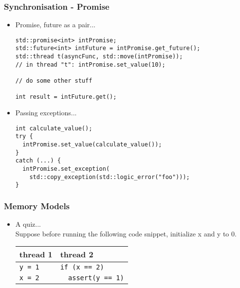 \documentclass{beamer}
\begin{document}
\begin{frame}[fragile]
\frametitle{Synchronisation - Promise}
\begin{itemize}
\item Promise, future as a pair...
{\scriptsize
\begin{verbatim}
std::promise<int> intPromise;
std::future<int> intFuture = intPromise.get_future();
std::thread t(asyncFunc, std::move(intPromise));
// in thread "t": intPromise.set_value(10);

// do some other stuff

int result = intFuture.get();
\end{verbatim}
}
\pause
\item Passing exceptions...
{\scriptsize
\begin{verbatim}
int calculate_value();
try {
  intPromise.set_value(calculate_value());
}
catch (...) {
  intPromise.set_exception(
    std::copy_exception(std::logic_error("foo")));
}
\end{verbatim}
}
\end{itemize}
\end{frame}

\begin{frame}[fragile]
\frametitle{Memory Models}
\begin{itemize}
\item<1-> A quiz...\\
Suppose before running the following code snippet, initialize x and y to 0.\\
{\scriptsize
\begin{tabular}{l|l}
thread 1& thread 2\\
\hline
\verb|y = 1| & \verb|if (x == 2)|\\
\verb|x = 2| & \verb|  assert(y == 1)|
\end{tabular}
}

\end{itemize}
\end{frame}
\end{document}
